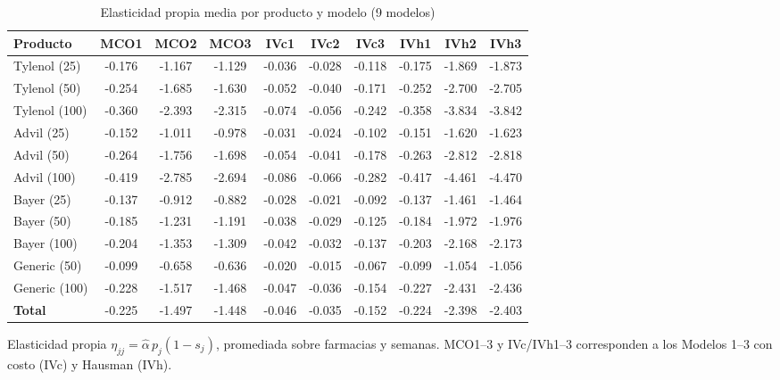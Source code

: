 \begin{table}[H]
\centering
\small
\caption{Elasticidad propia media por producto y modelo (9 modelos)}
\begin{tabular}{lccccccccc}
\toprule
Producto & MCO1 & MCO2 & MCO3 & IVc1 & IVc2 & IVc3 & IVh1 & IVh2 & IVh3 \\
\midrule
Tylenol (25) & -0.176 & -1.167 & -1.129 & -0.036 & -0.028 & -0.118 & -0.175 & -1.869 & -1.873 \\
Tylenol (50) & -0.254 & -1.685 & -1.630 & -0.052 & -0.040 & -0.171 & -0.252 & -2.700 & -2.705 \\
Tylenol (100) & -0.360 & -2.393 & -2.315 & -0.074 & -0.056 & -0.242 & -0.358 & -3.834 & -3.842 \\
Advil (25) & -0.152 & -1.011 & -0.978 & -0.031 & -0.024 & -0.102 & -0.151 & -1.620 & -1.623 \\
Advil (50) & -0.264 & -1.756 & -1.698 & -0.054 & -0.041 & -0.178 & -0.263 & -2.812 & -2.818 \\
Advil (100) & -0.419 & -2.785 & -2.694 & -0.086 & -0.066 & -0.282 & -0.417 & -4.461 & -4.470 \\
Bayer (25) & -0.137 & -0.912 & -0.882 & -0.028 & -0.021 & -0.092 & -0.137 & -1.461 & -1.464 \\
Bayer (50) & -0.185 & -1.231 & -1.191 & -0.038 & -0.029 & -0.125 & -0.184 & -1.972 & -1.976 \\
Bayer (100) & -0.204 & -1.353 & -1.309 & -0.042 & -0.032 & -0.137 & -0.203 & -2.168 & -2.173 \\
Generic (50) & -0.099 & -0.658 & -0.636 & -0.020 & -0.015 & -0.067 & -0.099 & -1.054 & -1.056 \\
Generic (100) & -0.228 & -1.517 & -1.468 & -0.047 & -0.036 & -0.154 & -0.227 & -2.431 & -2.436 \\
\midrule
\textbf{Total} & -0.225 & -1.497 & -1.448 & -0.046 & -0.035 & -0.152 & -0.224 & -2.398 & -2.403 \\
\bottomrule
\end{tabular}

\smallskip
{\footnotesize\begin{minipage}{0.92\linewidth}Elasticidad propia $\eta_{jj}=\hat{\alpha}\,p_j(1-s_j)$, promediada sobre farmacias y semanas. MCO1--3 y IVc/IVh1--3 corresponden a los Modelos 1--3 con costo (IVc) y Hausman (IVh).\end{minipage}}
\end{table}
